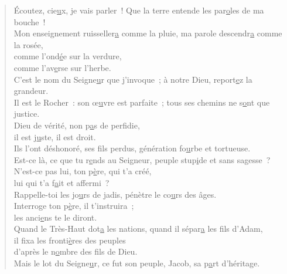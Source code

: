 \begin{verse}
Écoutez, cie\underline{u}x, je vais parler !\psalmstar
Que la terre entende les par\underline{o}les de ma bouche !\\
Mon enseignement ruisseller\underline{a} comme la pluie,\psalmstar
ma parole descendr\underline{a} comme la rosée,\\
comme l'ond\underline{é}e sur la verdure,\\
comme l'av\underline{e}rse sur l'herbe.\\

C'est le nom du Seigne\underline{u}r que j'invoque ;\psalmstar
à notre Dieu, report\underline{e}z la grandeur.\\
Il est le Rocher : son œ\underline{u}vre est parfaite ;\psalmstar
tous ses chemins ne s\underline{o}nt que justice.\\
Dieu de vérité, non p\underline{a}s de perfidie,\\
il est j\underline{u}ste, il est droit.\\

Ils l'ont déshonoré, ses f\underline{i}ls perdus,\psalmstar
génération fo\underline{u}rbe et tortueuse.\\
Est-ce là, ce que tu r\underline{e}nds au Seigneur,\psalmstar
peuple stup\underline{i}de et sans sagesse ?\\
N'est-ce pas lui, ton p\underline{è}re, qui t'a créé,\\
lui qui t'a f\underline{a}it et affermi ?\\

Rappelle-toi les jo\underline{u}rs de jadis,\psalmstar
pénètre le co\underline{u}rs des âges.\\
Interroge ton p\underline{è}re, il t'instruira ;\\
les anci\underline{e}ns te le diront.\\

Quand le Très-Haut dot\underline{a} les nations,\psalmstar
quand il sépar\underline{a} les fils d'Adam,\\
il fixa les fronti\underline{è}res des peuples\\
d'après le n\underline{o}mbre des fils de Dieu.\\
Mais le lot du Seigne\underline{u}r, ce fut son peuple,\psalmstar
Jacob, sa p\underline{a}rt d'héritage.\\


\end{verse}
